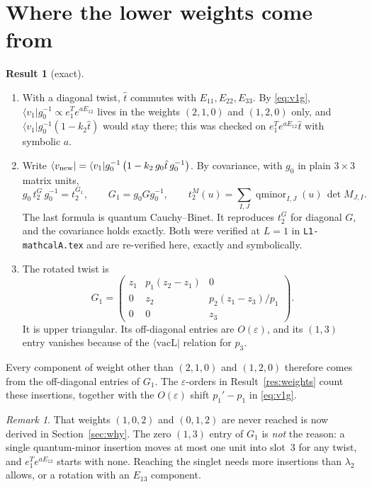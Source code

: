 \documentclass[11pt]{article}
\newcommand{\vacL}{\langle\mathrm{vacL}|}
\newcommand{\nb}[1]{\texttt{#1}}
\theoremstyle{definition}
\newtheorem{result}{Result}
\theoremstyle{remark}
\newtheorem*{remark}{Remark}
\begin{document}
\section{Where the lower weights come from}

\begin{result}[exact]\label{res:mech}\leavevmode
\begin{enumerate}
\item With a diagonal twist, $\hat t$ commutes with $E_{11},E_{22},E_{33}$. By \eqref{eq:v1g}, $\langle v_1|g_0^{-1}\propto e_1^Te^{aE_{12}}$ lives in the weights $(2,1,0)$ and $(1,2,0)$ only, and $\langle v_1|g_0^{-1}(1-k_2\hat t)$ would stay there; this was checked on $e_1^Te^{aE_{12}}\hat t$ with symbolic $a$.
\item Write $\langle v_{\rm new}|=\langle v_1|g_0^{-1}\,\big(1-k_2\,g_0\hat t\,g_0^{-1}\big)$. By covariance, with $g_0$ in plain $3\times3$ matrix units,
\begin{equation}
g_0\,t^G_2\,g_0^{-1}=t^{G_1}_2,\qquad G_1=g_0Gg_0^{-1},\qquad t^M_2(u)=\sum_{I,J}\operatorname{qminor}_{I,J}(u)\,\det M_{J,I}.
\end{equation}
The last formula is quantum Cauchy--Binet. It reproduces $t^G_2$ for diagonal $G$, and the covariance holds exactly. Both were verified at $L=1$ in \nb{L1-mathcalA.tex} and are re-verified here, exactly and symbolically.
\item The rotated twist is
\begin{equation}
G_1=\begin{pmatrix} z_1 & p_1(z_2-z_1) & 0\\ 0 & z_2 & p_2(z_1-z_3)/p_1\\ 0&0&z_3\end{pmatrix}.
\end{equation}
It is upper triangular. Its off-diagonal entries are $O(\varepsilon)$, and its $(1,3)$ entry vanishes because of the $\vacL$ relation for $p_3$.
\end{enumerate}
Every component of weight other than $(2,1,0)$ and $(1,2,0)$ therefore comes from the off-diagonal entries of $G_1$. The $\varepsilon$-orders in Result~\ref{res:weights} count these insertions, together with the $O(\varepsilon)$ shift $p_1'-p_1$ in \eqref{eq:v1g}.
\end{result}

\begin{remark}
That weights $(1,0,2)$ and $(0,1,2)$ are never reached is now derived in Section~\ref{sec:why}. The zero $(1,3)$ entry of $G_1$ is \emph{not} the reason: a single quantum-minor insertion moves at most one unit into slot~3 for any twist, and $e_1^Te^{aE_{12}}$ starts with none. Reaching the singlet needs more insertions than $\lambda_2$ allows, or a rotation with an $E_{13}$ component.
\end{remark}
\end{document}
